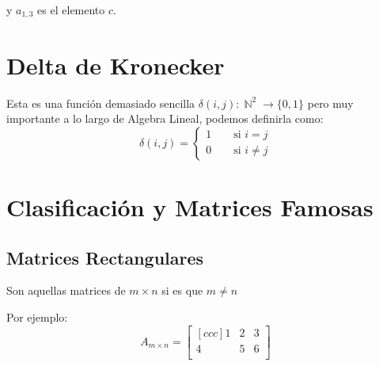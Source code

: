 \documentclass[12pt]{report}                                    %
\DeclareMathOperator \Space {\quad}                             %
\DeclareMathOperator \Naturals  {\mathbb{N}}                     %
\begin{document}
                y $a_{1,3}$ es el elemento $c$.


        \section{Delta de Kronecker}

            Esta es una función demasiado sencilla $\delta(i,j): \Naturals^2 \to \{0,1\}$
            pero muy importante a lo largo de Algebra Lineal, podemos definirla como:
            \begin{equation}
                \delta(i,j) =
                \begin{cases}
                    1 \Space \text{ si } i = j \\
                    0 \Space \text{ si } i \neq j
                \end{cases}
            \end{equation}



        \clearpage
        \section{Clasificación y Matrices Famosas}

            \subsection{Matrices Rectangulares}

                Son aquellas matrices de $m \times n$ si es que $m \neq n$ 

                Por ejemplo: 
                \begin{equation*}
                    A_{m \times n} =
                    \begin{bmatrix}[ccc]
                        1 & 2 & 3   \\
                        4 & 5 & 6   \\
                    \end{bmatrix}
                \end{equation*}
\end{document}
